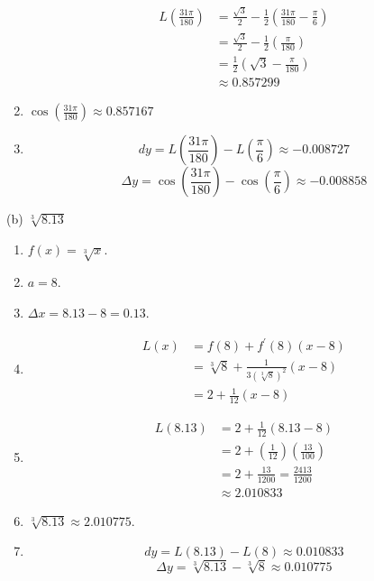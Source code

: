 \documentclass[nooutcomes]{ximera}
\renewenvironment{freeResponse}{
\ifhandout\setbox0\vbox\bgroup\else
\begin{trivlist}\item[\hskip \labelsep\bfseries Solution:\hspace{2ex}]
\fi}
{\ifhandout\egroup\else
\end{trivlist}
\fi}
\begin{document}
\begin{problem}
\begin{freeResponse}
\begin{enumerate}
\begin{align*}
      L \left( \frac{31 \pi}{180} \right) &= \frac{\sqrt{3}}{2} - \frac{1}{2} \left( \frac{31 \pi}{180} - \frac{\pi}{6} \right) \\
                                          &=  \frac{\sqrt{3}}{2} - \frac{1}{2} \left( \frac{\pi}{180} \right) \\
                                          &= \frac{1}{2} \left( \sqrt{3} - \frac{\pi}{180} \right) \\
                                          &\approx 0.857299
    \end{align*}
    \item[vi.]  $\cos \left( \frac{31 \pi}{180} \right) \approx 0.857167$
    \item[vii.]  
      $$ dy = L\left( \frac{31\pi}{180} \right) - L \left( \frac{\pi}{6} \right) \approx -0.008727 $$
      $$ \Delta y = \cos \left( \frac{31 \pi}{180} \right) - \cos \left( \frac{\pi}{6} \right) \approx -0.008858 $$
  \end{enumerate}
  
  (b)  $ \sqrt[3]{8.13}$
  \begin{enumerate}
    \item[i.]  $f(x) = \sqrt[3]{x}$.
    \item[ii.]  $a=8$.
    \item[iii.]  $\Delta x = 8.13 - 8 = 0.13$.
    \item[iv.]  
      \begin{align*}
        L(x) &= f(8) + f^\prime (8) (x-8) \\
             &= \sqrt[3]{8} + \frac{1}{3 (\sqrt[3]{8})^2} \left( x - 8 \right) \\
            &= 2 + \frac{1}{12} (x-8) 
      \end{align*}
    \item[v.]  
      \begin{align*}
        L(8.13) &= 2 + \frac{1}{12} (8.13 - 8) \\
                &= 2 + \left( \frac{1}{12} \right) \left( \frac{13}{100} \right) \\
                &= 2 + \frac{13}{1200} = \frac{2413}{1200} \\
                &\approx 2.010833
      \end{align*}
    \item[vi.]  $\sqrt[3]{8.13} \approx 2.010775$.
    \item[vii.]  
      $$ dy = L(8.13) - L(8) \approx 0.010833 $$
      $$ \Delta y = \sqrt[3]{8.13} - \sqrt[3]{8} \approx 0.010775 $$
    \end{enumerate}
\end{freeResponse}
\end{problem}
\end{document}
